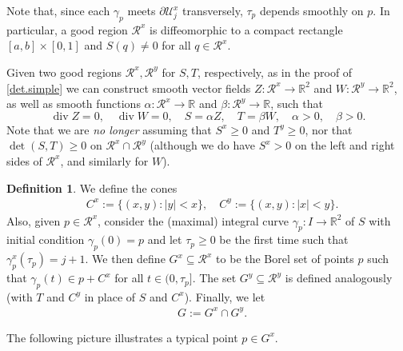 \documentclass[11pt,a4paper]{amsart}
\newcommand{\Z}{\mathbb{Z}}
\newcommand{\R}{\mathbb{R}}
\newcommand{\de}{\partial}
\theoremstyle{definition}
\newtheorem{definition}{Definition}[section]
\DeclareMathOperator{\dive}{div}
\newcommand{\str}{\mathcal{U}}
\begin{document}
Note that, since each $\gamma_p$ meets $\de\str_j^x$ transversely, $\tau_p$
depends smoothly on $p$. In particular, a good region $\mathcal{R}^x$
is diffeomorphic to a compact rectangle $[a,b]\times[0,1]$ and $S(q)\neq0$
for all $q\in\mathcal{R}^x$.

Given two good regions $\mathcal{R}^x,\mathcal{R}^y$ for $S,T$, respectively,
as in the proof of \cref{det.simple} we can construct smooth vector fields
$Z:\mathcal{R}^x\to\R^2$ and $W:\mathcal{R}^y\to\R^2$, as well as smooth functions $\alpha:\mathcal{R}^x\to\R$
and $\beta:\mathcal{R}^y\to\R$, such that
$$\dive Z=0,\quad\dive W=0,\quad S=\alpha Z,\quad T=\beta W,\quad \alpha>0,\quad \beta>0.$$
Note that we are \emph{no longer} assuming that $S^x\ge0$ and $T^y\ge0$, nor that $\det(S,T)\ge0$
on $\mathcal{R}^x\cap\mathcal{R}^y$ (although we do have $S^x>0$ on the left and right sides of $\mathcal{R}^x$,
and similarly for $W$).


\begin{definition}\label{g.def}
	We define the cones
	\begin{align*}
		&C^x:=\{(x,y):|y|<x\},\quad C^y:=\{(x,y):|x|<y\}.
	\end{align*}
	Also, given $p\in\mathcal{R}^x$, consider the (maximal) integral curve $\gamma_p:I\to\R^2$ of $S$ with initial condition $\gamma_p(0)=p$ and let $\tau_p\ge 0$ be the first time such that $\gamma_p^x(\tau_p)=j+1$. %
	We then define $G^x\subseteq\mathcal{R}^x$ to be the Borel set of points $p$ such that $\gamma_p(t)\in p+C^x$ for all $t\in(0,\tau_p]$. The set $G^y\subseteq\mathcal{R}^y$ is defined analogously (with $T$ and $C^y$ in place of $S$ and $C^x$). Finally, we let
	\begin{align*}
		&G:=G^x\cap G^y.
	\end{align*}
\end{definition}

The following picture illustrates a typical point $p\in G^x$.
\end{document}
